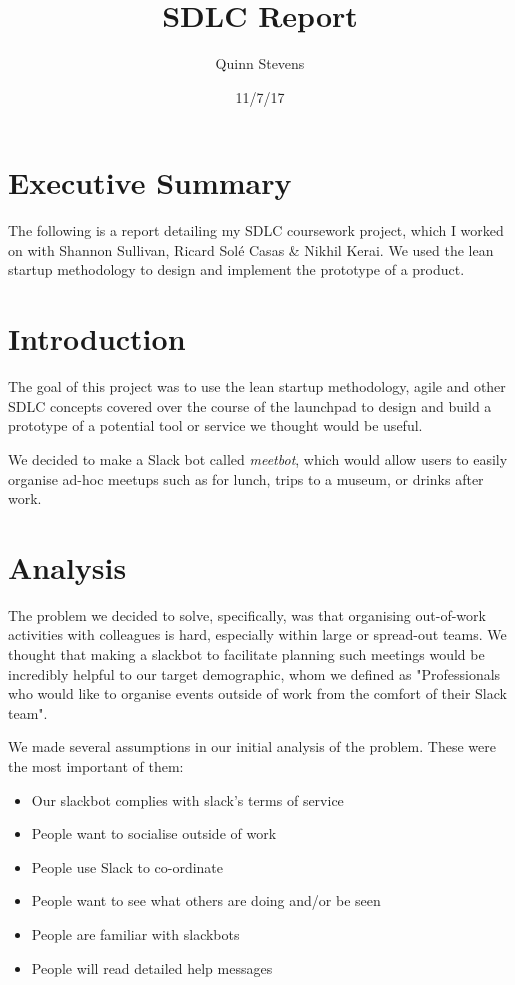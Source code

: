 \documentclass{report}
\author{Quinn Stevens}
\title{SDLC Report}
\date{11/7/17}
\begin{document}
\maketitle
\section*{Executive Summary}
The following is a report detailing my SDLC coursework project, which I worked on with Shannon Sullivan, Ricard Sol\'e Casas \& Nikhil Kerai. We used the lean startup methodology to design and implement the prototype of a product.
\tableofcontents

\section{Introduction}
The goal of this project was to use the lean startup methodology, agile and other SDLC concepts covered over the course of the launchpad to design and build a prototype of a potential tool or service we thought would be useful.

We decided to make a Slack bot called \emph{meetbot}, which would allow users to easily organise ad-hoc meetups such as for lunch, trips to a museum, or drinks after work.

\section{Analysis}
The problem we decided to solve, specifically, was that organising out-of-work activities with colleagues is hard, especially within large or spread-out teams. We thought that making a slackbot to facilitate planning such meetings would be incredibly helpful to our target demographic, whom we defined as "Professionals who would like to organise events outside of work from the comfort of their Slack team".

We made several assumptions in our initial analysis of the problem. These were the most important of them:

\begin{itemize}
	\item Our slackbot complies with slack's terms of service
	\item People want to socialise outside of work
	\item People use Slack to co-ordinate
	\item People want to see what others are doing and/or be seen
	\item People are familiar with slackbots
	\item People will read detailed help messages
\end{itemize}
\end{document}
